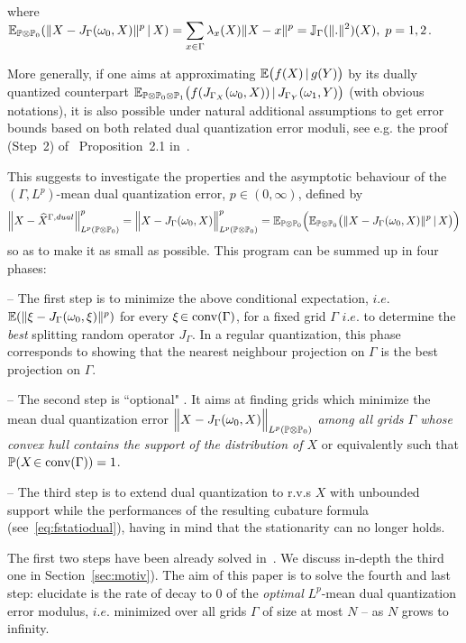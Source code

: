 where $\displaystyle \mathbb{E}_{\mathbb{P}\otimes\mathbb{P}_0}(\|X-J_{\Gamma}(\omega_0,X)\|^p\,|\,X)= \sum_{x\in\Gamma}\lambda_x(X)\|X-x\|^p= \mathbb{J}_{\Gamma}(\|.\|^2)(X),\; p=1,2$.

More generally, if one aims at approximating $\mathbb{E}\big (f(X)\,|\, g(Y) \big)$ by its dually quantized counterpart $\mathbb{E}_{\mathbb{P}\otimes\mathbb{P}_0\otimes\mathbb{P}_1}\big (f(J_{\Gamma_X}(\omega_0,X))\,|\, J_{\Gamma_Y}(\omega_1,Y) \big)$  (with obvious notations),  it is also possible under natural additional assumptions  to get  error bounds based on both related dual quantization error moduli, see e.g. the proof (Step~2) of ~Proposition~2.1 in~\cite{dualAppl}.


This suggests  to investigate the properties and the asymptotic    behaviour  of the $(\Gamma, L^p)$-mean dual quantization error, $p\!\in (0,\infty)$, defined by
$$
\Big\|X-\widehat X^{\Gamma,dual}\Big\|^p_{L^p(\mathbb{P}\otimes\mathbb{P}_0)}= \Big\|X-J_{\Gamma}(\omega_0,X)\Big\|^p_{L^p(\mathbb{P}\otimes\mathbb{P}_0)}= \mathbb{E}_{\mathbb{P}\otimes\mathbb{P}_0} \Big( \mathbb{E}_{\mathbb{P}\otimes\mathbb{P}_0}\big(\|X-J_{\Gamma}(\omega_0,X)\|^p\,|\, X\big) \Big)
$$ 
so as to make it as small as possible. This program can be summed up in four phases:

\smallskip
-- The first step is to minimize the above conditional expectation, $i.e.$  $\mathbb{E}(\|\xi-J_{\Gamma}(\omega_0,\xi)\|^p)$ for every $\xi \!\in\operatorname{conv}(\Gamma)$, for a fixed grid $\Gamma$ $i.e.$ to determine the {\em best}  splitting random operator $J_{\Gamma}$. In a  regular quantization, this phase corresponds to showing that the nearest neighbour projection on $\Gamma$ is   the best projection on $\Gamma$.


\smallskip
-- The second step is ``optional" . It aims at finding grids which minimize the
mean dual quantization error $\Big\|X-J_{\Gamma}(\omega_0,X)\Big\|_{L^p(\mathbb{P}\otimes\mathbb{P}_0)}$ {\em among all grids $\Gamma$ whose convex hull contains the support of the distribution of $X$} or equivalently such that $\mathbb{P}(X\!\in \operatorname{conv}(\Gamma))=1$.

\smallskip
-- The third step is to extend  dual quantization to r.v.s $X$ with unbounded support while  the performances of the resulting  cubature formula (see~\eqref{eq:fstatiodual}), having in mind that  the stationarity can no longer holds.

\smallskip
The first two steps have  been already solved in~\cite{dualStat}. We discuss  in-depth the third one in Section~\ref{sec:motiv}). The aim of this paper is to solve the fourth and last  step:   elucidate  is the rate of  decay  to $0$ of the   {\em optimal} $L^p$-mean dual quantization error modulus, $i.e.$ minimized over all grids $\Gamma$ of size at most $N$ -- as $N$ grows to infinity.

